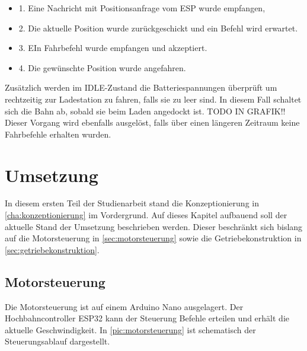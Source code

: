\begin{center}
	\begin{itemize}
		\item 1. Eine Nachricht mit Positionsanfrage vom ESP wurde empfangen,
		\item 2. Die aktuelle Position wurde zurückgeschickt und ein Befehl wird erwartet.
		\item 3. EIn Fahrbefehl wurde empfangen und akzeptiert.
		\item 4. Die gewünschte Position wurde angefahren.
	\end{itemize}
\end{center}

Zusätzlich werden im IDLE-Zustand die Batteriespannungen überprüft um rechtzeitig zur Ladestation zu fahren, falls sie zu leer sind. In diesem Fall schaltet sich die Bahn ab, sobald sie beim Laden angedockt ist. TODO IN GRAFIK!! Dieser Vorgang wird ebenfalls ausgelöst, falls über einen längeren Zeitraum keine Fahrbefehle erhalten wurden.


\chapter{Umsetzung}
\label{cha:umsetzung}
In diesem ersten Teil der Studienarbeit stand die Konzeptionierung in \autoref{cha:konzeptionierung} im Vordergrund. Auf dieses Kapitel aufbauend soll der aktuelle Stand der Umsetzung beschrieben werden. Dieser beschränkt sich bislang auf die Motorsteuerung in \autoref{sec:motorsteuerung} sowie die Getriebekonstruktion in \autoref{sec:getriebekonstruktion}.
\newpage
 
\section{Motorsteuerung}
\label{sec:motorsteuerung}
Die Motorsteuerung ist auf einem Arduino Nano ausgelagert. Der Hochbahncontroller ESP32 kann der Steuerung Befehle erteilen und erhält die aktuelle Geschwindigkeit. In \autoref{pic:motorsteuerung} ist schematisch der Steuerungsablauf  dargestellt. 


